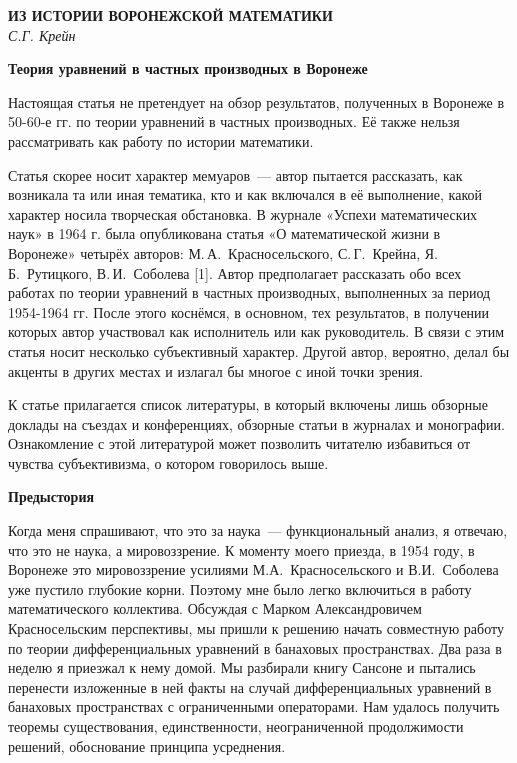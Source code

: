 \begin{center}{ \bf ИЗ ИСТОРИИ ВОРОНЕЖСКОЙ МАТЕМАТИКИ}\\
{\it С.Г. Крейн} \\
\end{center}

{ \bf Теория уравнений в частных производных в Воронеже}

Настоящая статья не претендует на обзор результатов, полученных в Воронеже в 50-60-е гг. по теории уравнений в частных производных. Её также нельзя рассматривать как работу по истории математики.

Статья скорее носит характер мемуаров~--- автор пытается рассказать, как возникала та или иная тематика,
кто и как включался в её выполнение, какой характер носила творческая обстановка.
В журнале «Успехи математических наук» в 1964 г. была опубликована статья «О математической жизни в Воронеже»
четырёх авторов: М.\,А.~Красносельского, С.\,Г.~Крейна, Я.\,Б.~Рутицкого, В.\,И.~Соболева [1].
Автор предполагает рассказать обо всех работах по теории уравнений в частных производных, выполненных за период 1954-1964 гг. После этого коснёмся, в основном, тех результатов, в получении которых автор участвовал как исполнитель или как руководитель. В связи с этим статья носит несколько субъективный характер. Другой автор, вероятно, делал бы акценты в других местах и излагал бы многое с иной точки зрения.

К статье прилагается список литературы, в который
\linebreak
включены лишь обзорные доклады на съездах и конференциях,
обзорные статьи в журналах и монографии. Ознакомление с этой литературой может позволить читателю избавиться от чувства субъективизма, о котором говорилось выше.

{\bf Предыстория}

Когда меня спрашивают, что это за наука~--- функциональный анализ, я отвечаю, что это не наука, а мировоззрение.
К моменту моего приезда, в 1954 году, в Воронеже это мировоззрение усилиями М.А.~Красносельского и В.И.~Соболева уже пустило глубокие корни. Поэтому мне было легко включиться в работу математического коллектива. Обсуждая с Марком Александровичем Красносельским перспективы, мы пришли к решению начать совместную работу по теории дифференциальных уравнений в банаховых пространствах. Два раза в неделю я приезжал к нему домой. Мы разбирали книгу Сансоне и пытались
перенести изложенные в ней факты на случай дифференциальных уравнений в банаховых пространствах с ограниченными операторами. Нам удалось получить теоремы существования, единственности, неограниченной продолжимости решений, обоснование принципа усреднения.

